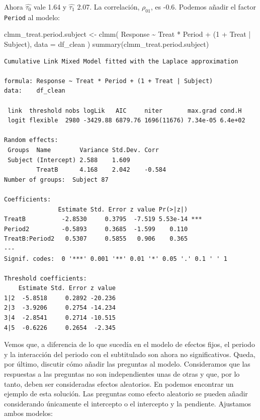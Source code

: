 \documentclass[
  12pt,
  a4paper,
  extrafontsizes,
  onecolumn,
  openright]{memoir}
\newenvironment{Shaded}{\begin{snugshade}}{\end{snugshade}}
\newcommand{\AttributeTok}[1]{\textcolor[rgb]{0.40,0.45,0.13}{#1}}
\newcommand{\DecValTok}[1]{\textcolor[rgb]{0.68,0.00,0.00}{#1}}
\newcommand{\FunctionTok}[1]{\textcolor[rgb]{0.28,0.35,0.67}{#1}}
\newcommand{\NormalTok}[1]{\textcolor[rgb]{0.00,0.23,0.31}{#1}}
\newcommand{\OtherTok}[1]{\textcolor[rgb]{0.00,0.23,0.31}{#1}}
\newcommand{\SpecialCharTok}[1]{\textcolor[rgb]{0.37,0.37,0.37}{#1}}
\begin{document}
\normalsize

Ahora \(\widehat{\tau_0}\) vale 1.64 y \(\widehat{\tau_1}\) 2.07. La
correlación, \(\rho_{01}\), es -0.6. Podemos añadir el factor
\texttt{Period} al modelo:

\scriptsize

\begin{Shaded}
\begin{Highlighting}[]
\NormalTok{clmm\_treat.period.subject }\OtherTok{\textless{}{-}} \FunctionTok{clmm}\NormalTok{(}
\NormalTok{    Response }\SpecialCharTok{\textasciitilde{}}\NormalTok{ Treat }\SpecialCharTok{*}\NormalTok{ Period }\SpecialCharTok{+}\NormalTok{ (}\DecValTok{1} \SpecialCharTok{+}\NormalTok{ Treat }\SpecialCharTok{|}\NormalTok{ Subject),}
    \AttributeTok{data =}\NormalTok{ df\_clean}
\NormalTok{)}
\FunctionTok{summary}\NormalTok{(clmm\_treat.period.subject)}
\end{Highlighting}
\end{Shaded}

\begin{verbatim}
Cumulative Link Mixed Model fitted with the Laplace approximation

formula: Response ~ Treat * Period + (1 + Treat | Subject)
data:    df_clean

 link  threshold nobs logLik   AIC     niter       max.grad cond.H 
 logit flexible  2980 -3429.88 6879.76 1696(11676) 7.34e-05 6.4e+02

Random effects:
 Groups  Name        Variance Std.Dev. Corr   
 Subject (Intercept) 2.588    1.609           
         TreatB      4.168    2.042    -0.584 
Number of groups:  Subject 87 

Coefficients:
               Estimate Std. Error z value Pr(>|z|)    
TreatB          -2.8530     0.3795  -7.519 5.53e-14 ***
Period2         -0.5893     0.3685  -1.599    0.110    
TreatB:Period2   0.5307     0.5855   0.906    0.365    
---
Signif. codes:  0 '***' 0.001 '**' 0.01 '*' 0.05 '.' 0.1 ' ' 1

Threshold coefficients:
    Estimate Std. Error z value
1|2  -5.8518     0.2892 -20.236
2|3  -3.9206     0.2754 -14.234
3|4  -2.8541     0.2714 -10.515
4|5  -0.6226     0.2654  -2.345
\end{verbatim}

\normalsize

Vemos que, a diferencia de lo que sucedía en el modelo de efectos fijos,
el periodo y la interacción del periodo con el subtitulado son ahora no
significativos. Queda, por último, discutir cómo añadir las preguntas al
modelo. Consideramos que las respuestas a las preguntas no son
independientes unas de otras y que, por lo tanto, deben ser consideradas
efectos aleatorios. En \textcite{burkner2021}
\textcite[pp.~19-20]{burkner2019} podemos encontrar un ejemplo de esta
solución. Las preguntas como efecto aleatorio se pueden añadir
considerando únicamente el intercepto o el intercepto y la pendiente.
Ajustamos ambos modelos:
\end{document}
